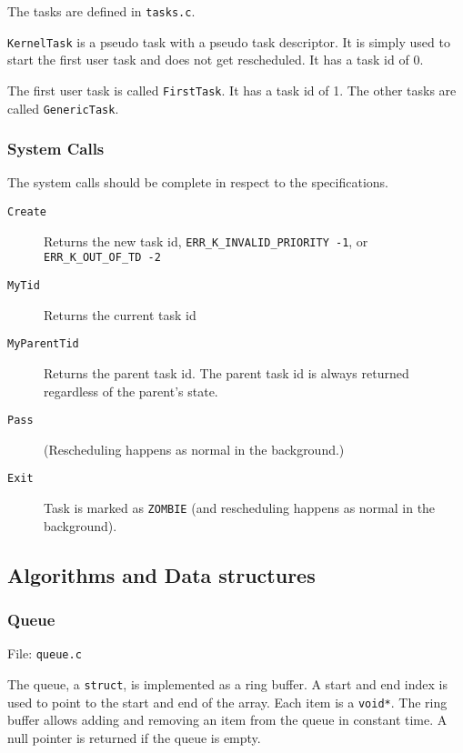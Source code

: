 \documentclass[letterpaper,12pt]{article}
\begin{document}
The tasks are defined in \texttt{tasks.c}.

\texttt{KernelTask} is a pseudo task with a pseudo task descriptor. It is simply used to start the first user task and does not get rescheduled. It has a task id of 0.

The first user task is called \texttt{FirstTask}. It has a task id of 1. The other tasks are called \texttt{GenericTask}.


\subsubsection{System Calls%
  \label{system-calls}%
}

The system calls should be complete in respect to the specifications.
%
\begin{description}
\item[{\texttt{Create}}] \leavevmode 
Returns the new task id, \texttt{ERR\_K\_INVALID\_PRIORITY -1}, or \texttt{ERR\_K\_OUT\_OF\_TD -2}

\item[{\texttt{MyTid}}] \leavevmode 
Returns the current task id

\item[{\texttt{MyParentTid}}] \leavevmode 
Returns the parent task id. The parent task id is always returned regardless of the parent's state.

\item[{\texttt{Pass}}] \leavevmode 
(Rescheduling happens as normal in the background.)

\item[{\texttt{Exit}}] \leavevmode 
Task is marked as \texttt{ZOMBIE} (and rescheduling happens as normal in the background).

\end{description}


\subsection{Algorithms and Data structures%
  \label{algorithms-and-data-structures}%
}


\subsubsection{Queue%
  \label{queue}%
}

File: \texttt{queue.c}

The queue, a \texttt{struct}, is implemented as a ring buffer. A start and end index is used to point to the start and end of the array. Each item is a \texttt{void*}. The ring buffer allows adding and removing an item from the queue in constant time. A null pointer is returned if the queue is empty.
\end{document}
